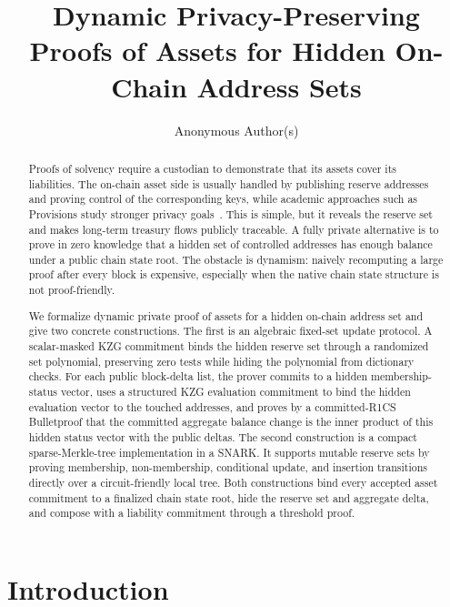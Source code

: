 \documentclass[runningheads]{llncs}
\title{Dynamic Privacy-Preserving Proofs of Assets for Hidden On-Chain Address Sets}
\author{Anonymous Author(s)}
\institute{}
\begin{document}
\maketitle

\begin{abstract}
Proofs of solvency require a custodian to demonstrate that its assets cover its liabilities.  The on-chain asset side is usually handled by publishing reserve addresses and proving control of the corresponding keys, while academic approaches such as Provisions study stronger privacy goals~\cite{Provisions15}.  This is simple, but it reveals the reserve set and makes long-term treasury flows publicly traceable.  A fully private alternative is to prove in zero knowledge that a hidden set of controlled addresses has enough balance under a public chain state root.  The obstacle is dynamism: naively recomputing a large proof after every block is expensive, especially when the native chain state structure is not proof-friendly.

We formalize dynamic private proof of assets for a hidden on-chain address set and give two concrete constructions.  The first is an algebraic fixed-set update protocol.  A scalar-masked KZG commitment binds the hidden reserve set through a randomized set polynomial, preserving zero tests while hiding the polynomial from dictionary checks.  For each public block-delta list, the prover commits to a hidden membership-status vector, uses a structured KZG evaluation commitment to bind the hidden evaluation vector to the touched addresses, and proves by a committed-R1CS Bulletproof that the committed aggregate balance change is the inner product of this hidden status vector with the public deltas.  The second construction is a compact sparse-Merkle-tree implementation in a SNARK.  It supports mutable reserve sets by proving membership, non-membership, conditional update, and insertion transitions directly over a circuit-friendly local tree.  Both constructions bind every accepted asset commitment to a finalized chain state root, hide the reserve set and aggregate delta, and compose with a liability commitment through a threshold proof.
\end{abstract}

\section{Introduction}
\end{document}
